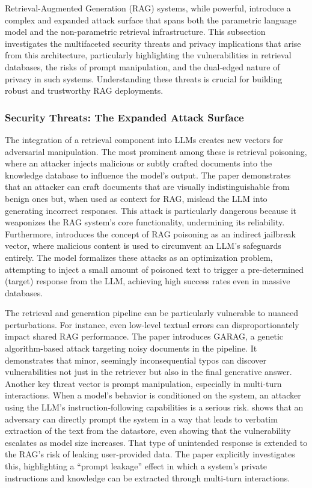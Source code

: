 \documentclass[11pt]{article}
\begin{document}
Retrieval-Augmented Generation (RAG) systems, while powerful, introduce a complex and expanded attack surface that spans both the parametric language model and the non-parametric retrieval infrastructure. This subsection investigates the multifaceted security threats and privacy implications that arise from this architecture, particularly highlighting the vulnerabilities in retrieval databases, the risks of prompt manipulation, and the dual-edged nature of privacy in such systems. Understanding these threats is crucial for building robust and trustworthy RAG deployments.

\subsubsection{Security Threats: The Expanded Attack Surface}

The integration of a retrieval component into LLMs creates new vectors for adversarial manipulation. The most prominent among these is retrieval poisoning, where an attacker injects malicious or subtly crafted documents into the knowledge database to influence the model's output. The \cite{ref256} paper demonstrates that an attacker can craft documents that are visually indistinguishable from benign ones but, when used as context for RAG, mislead the LLM into generating incorrect responses. This attack is particularly dangerous because it weaponizes the RAG system's core functionality, undermining its reliability. Furthermore, \cite{ref267} introduces the concept of RAG poisoning as an indirect jailbreak vector, where malicious content is used to circumvent an LLM's safeguards entirely. The \cite{ref257} model formalizes these attacks as an optimization problem, attempting to inject a small amount of poisoned text to trigger a pre-determined (target) response from the LLM, achieving high success rates even in massive databases.

The retrieval and generation pipeline can be particularly vulnerable to nuanced perturbations. For instance, even low-level textual errors can disproportionately impact shared RAG performance. The \cite{ref258} paper introduces GARAG, a genetic algorithm-based attack targeting noisy documents in the pipeline. It demonstrates that minor, seemingly inconsequential typos can discover vulnerabilities not just in the retriever but also in the final generative answer. Another key threat vector is prompt manipulation, especially in multi-turn interactions. When a model's behavior is conditioned on the system, an attacker using the LLM's instruction-following capabilities is a serious risk. \cite{ref268} shows that an adversary can directly prompt the system in a way that leads to verbatim extraction of the text from the datastore, even showing that the vulnerability escalates as model size increases. That type of unintended response is extended to the RAG's risk of leaking user-provided data. The \cite{ref269} paper explicitly investigates this, highlighting a ``prompt leakage'' effect in which a system's private instructions and knowledge can be extracted through multi-turn interactions.
\end{document}
